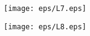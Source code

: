 ~\phantom{-}
\vfill
\pagestyle{empty}

\begin{figure}[H]
\centering
\thispagestyle{empty}
\texttt{[image: eps/L7.eps]}
\end{figure}

\thispagestyle{empty}

\begin{figure}[H]
\centering
\texttt{[image: eps/L8.eps]}
\end{figure}







